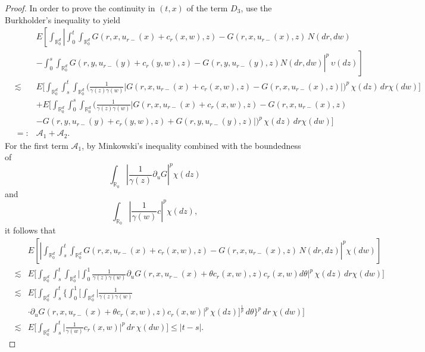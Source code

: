 \documentclass[12pt,oneside, reqno]{amsart}
\newcommand{\be}{\begin{eqnarray}}
\newcommand{\ee}{\end{eqnarray}}
\newcommand{\ce}{\begin{eqnarray*}}
\newcommand{\de}{\end{eqnarray*}}
\def\no{\nonumber}
\def\mR{{\mathbb R}}
\def\sA{{\mathscr A}}
\def\leq{\leqslant}
\numberwithin{equation}{section}
\begin{document}
\begin{proof}
In order to prove the continuity in $(t,x)$ of the term $D_3$, use the  Burkholder's inequality \cite[Proposition 2.6.1]{KunitaHiroshi2019} to yield
\ce 
&&E\left[\int_{\mR^d_0}\left|\int_0^t\int_{\mR^d_0}
G(r,x,u_{r-}(x)+c_r(x,w),z)-G(r,x,u_{r-}(x),z)\,N(dr,dw)\right.\right.\\
&&\left.\left.-\int_0^s\int_{\mR^d_0}
G(r,y,u_{r-}(y)+c_r(y,w),z)-G(r,y,u_{r-}(y),z)N(dr,dw)\right|^p\,\upsilon(dz)\right]\\
&\lesssim&
E\bigg[\int_{\mR^d_0}\int_s^t\int_{\mR^d_0}
\bigg(\frac{1}{\gamma(z)\gamma(w)}\left|G(r,x,u_{r-}(x)+c_r(x,w),z)-G(r,x,u_{r-}(x),z)\right|\bigg)^p\,\chi(dz)\,dr\chi(dw)\bigg]\\
&&+E\bigg[\int_{\mR^d_0}\int_0^s\int_{\mR^d_0}
\bigg(\frac{1}{\gamma(z)\gamma(w)}\left|G(r,x,u_{r-}(x)+c_r(x,w),z)-G(r,x,u_{r-}(x),z)\right.\\
&&\left.-G(r,y,u_{r-}(y)+c_r(y,w),z)+G(r,y,u_{r-}(y),z)\right|\bigg)^p\,\chi(dz)\,dr\chi(dw)\bigg]\\
&=:&\sA_1+\sA_2.
\de 
For the first term $\sA_1$, by Minkowski's inequality combined with the boundedness of $$\int_{\mR_0} |\frac{1}{\gamma(z)}\partial_{u} G|^p\chi(dz) $$ and $$\int_{\mR_0} |\frac{1}{\gamma(w)} c|^p\chi(dz), $$ it follows that
\be\label{SAestimate-3}
&&E\left[\left|\int_{\mR^d_0}\int_s^t\int_{\mR^d_0}
G(r,x,u_{r-}(x)+c_r(x,w),z)-G(r,x,u_{r-}(x),z)\,N(dr,dz)\right|^p\chi(dw)\right]\no\\
&\lesssim&E\bigg[\int_{\mR^d_0}\int_s^t\int_{\mR^d_0}
\bigg|\int_0^1\frac{1}{\gamma(z)\gamma(w)}\partial_u G(r,x,u_{r-}(x)+\theta c_r(x,w),z)c_r(x,w)d\theta\bigg|^p\,\chi(dz)\,dr\chi(dw)\bigg]\no\\
&\lesssim&E\bigg[\int_{\mR^d_0}\int_s^t\bigg\{\int_0^1\bigg[\int_{\mR^d_0}
\bigg|\frac{1}{\gamma(z)\gamma(w)}\no\\
&&\cdot\partial_u G(r,x,u_{r-}(x)+\theta c_r(x,w),z)c_r(x,w)\bigg|^p\,\chi(dz)\bigg]^{\frac{1}{p}}\,d\theta\bigg\}^p\,dr\,\chi(dw)\bigg]\no\\
&\lesssim&E\bigg[\int_{\mR^d_0}\int_s^t
\bigg|\frac{1}{\gamma(w)}c_r(x,w)\bigg|^p\,dr\,\chi(dw)\bigg]\leq |t-s|.
\ee


\end{proof}
\end{document}
